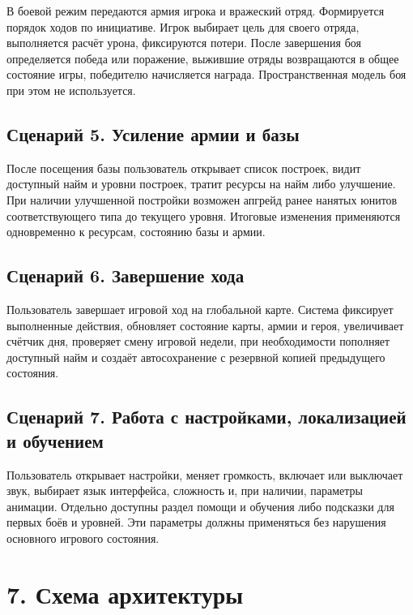 \documentclass[12pt,a4paper]{article}
\begin{document}
В боевой режим передаются армия игрока и вражеский отряд. Формируется порядок ходов по инициативе. Игрок выбирает цель для своего отряда, выполняется расчёт урона, фиксируются потери. После завершения боя определяется победа или поражение, выжившие отряды возвращаются в общее состояние игры, победителю начисляется награда. Пространственная модель боя при этом не используется.

\subsection*{Сценарий 5. Усиление армии и базы}

После посещения базы пользователь открывает список построек, видит доступный найм и уровни построек, тратит ресурсы на найм либо улучшение. При наличии улучшенной постройки возможен апгрейд ранее нанятых юнитов соответствующего типа до текущего уровня. Итоговые изменения применяются одновременно к ресурсам, состоянию базы и армии.

\subsection*{Сценарий 6. Завершение хода}

Пользователь завершает игровой ход на глобальной карте. Система фиксирует выполненные действия, обновляет состояние карты, армии и героя, увеличивает счётчик дня, проверяет смену игровой недели, при необходимости пополняет доступный найм и создаёт автосохранение с резервной копией предыдущего состояния.

\subsection*{Сценарий 7. Работа с настройками, локализацией и обучением}

Пользователь открывает настройки, меняет громкость, включает или выключает звук, выбирает язык интерфейса, сложность и, при наличии, параметры анимации. Отдельно доступны раздел помощи и обучения либо подсказки для первых боёв и уровней. Эти параметры должны применяться без нарушения основного игрового состояния.

\section*{7. Схема архитектуры}
\end{document}
